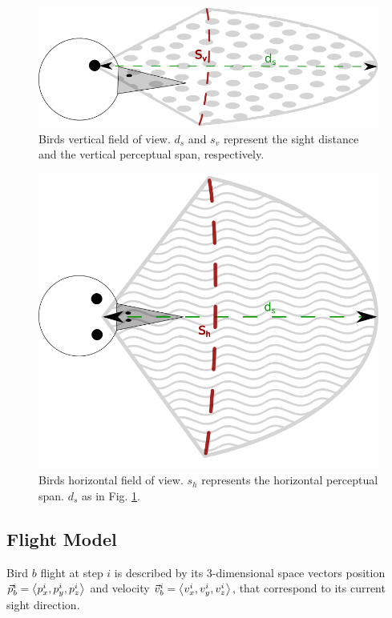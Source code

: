 \begin{figure}[h!]
	\includegraphics[scale=0.45]{./images/birdflocking/verticalFow.png}
	\caption{Birds vertical field of view. \(d_s\) and \(s_v\) represent the sight distance and the vertical perceptual span, respectively. }
	\label{fig:vFOV}
	
\end{figure}	

\begin{figure}[h!]
	\centering
	\includegraphics[scale=0.375]{./images/birdflocking/hFow.png}
	\caption{Birds horizontal field of view. \(s_h\) represents the horizontal perceptual span. \(d_s\) as in Fig. \ref{fig:vFOV}. }
	\label{fig:hFOV}
	
\end{figure}	


\subsection{Flight Model}
Bird $b$ flight at step $i$ is described by its $3$-dimensional space vectors
position $\vec{p}_b^i=\expval{p^i_x,p^i_y,p^i_z}$ and velocity
$\vec{v}_b^i=\expval{v^i_x,v^i_y,v^i_z}$, that correspond to its current sight
direction. 


